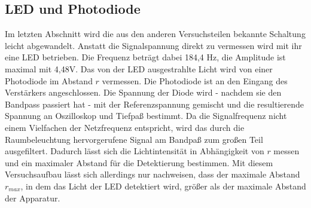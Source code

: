 \subsection{LED und Photodiode}
Im letzten Abschnitt wird die aus den anderen Versuchsteilen bekannte Schaltung
leicht abgewandelt. Anstatt die Signalspannung direkt zu vermessen wird mit ihr
eine LED betrieben. Die Frequenz beträgt dabei 184,4 Hz, die Amplitude ist
maximal mit 4,48V. Das von der LED ausgestrahlte Licht wird von einer Photodiode
im Abstand $r$ vermessen. Die Photodiode ist an den Eingang des Verstärkers
angeschlossen. Die Spannung der Diode wird
- nachdem sie den Bandpass passiert hat - mit der
Referenzspannung gemischt und die resultierende Spannung an
Oszilloskop und Tiefpaß bestimmt. Da die Signalfrequenz nicht einem Vielfachen
der Netzfrequenz entspricht, wird das durch die Raumbeleuchtung hervorgerufene
Signal am Bandpaß
zum großen Teil ausgefiltert. Dadurch lässt sich die Lichtintensität in
Abhängigkeit von $r$ messen und ein maximaler Abstand für die Detektierung
bestimmen. Mit diesem Versuchsaufbau lässt sich allerdings nur nachweisen, dass
der maximale Abstand $r_{max}$, in dem das Licht der LED detektiert wird,
größer als der maximale Abstand der Apparatur.

